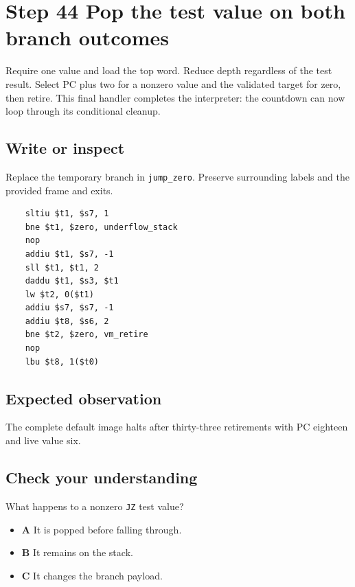\section{Step 44 Pop the test value on both branch outcomes}\label{vm-s44}

Require one value and load the top word. Reduce depth regardless of the test result. Select PC plus two for a nonzero value and the validated target for zero, then retire. This final handler completes the interpreter: the countdown can now loop through its conditional cleanup.

\subsection{Write or inspect}
Replace the temporary branch in \texttt{jump\_zero}. Preserve surrounding labels and the provided frame and exits.

\begin{verbatim}
    sltiu $t1, $s7, 1
    bne $t1, $zero, underflow_stack
    nop
    addiu $t1, $s7, -1
    sll $t1, $t1, 2
    daddu $t1, $s3, $t1
    lw $t2, 0($t1)
    addiu $s7, $s7, -1
    addiu $t8, $s6, 2
    bne $t2, $zero, vm_retire
    nop
    lbu $t8, 1($t0)
\end{verbatim}
\subsection{Expected observation}
The complete default image halts after thirty-three retirements with PC eighteen and live value six.

\subsection{Check your understanding}
What happens to a nonzero \texttt{JZ} test value?

\begin{itemize}
  \item \textbf{A} It is popped before falling through.
  \item \textbf{B} It remains on the stack.
  \item \textbf{C} It changes the branch payload.
\end{itemize}
